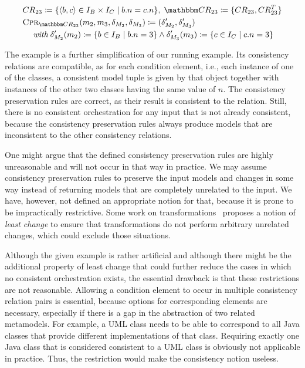 \begin{align*}
    &
    \consistencyrelation{CR}{23} \equalsperdefinition \setted{\tupled{b,c} \in \instances{\class{B}{}} \times \instances{\class{C}{}} \mid b.n = c.n}, \;
    \consistencyrelationset{CR}_{23} \equalsperdefinition \setted{\consistencyrelation{CR}{23}, \consistencyrelation{CR}{23}^T} \\
    &
    \consistencypreservationrule{\consistencyrelationset{CR}_{23}}(\model{m}{2}, \model{m}{3}, \change{\metamodel{M}{2}}, \change{\metamodel{M}{3}}) \equalsperdefinition (\change{\metamodel{M}{2}}', \change{\metamodel{M}{3}}') \\
    & \formulaskip
        \withmath \change{\metamodel{M}{2}}'(\model{m}{2}) \equalsperdefinition \setted{b \in \instances{\class{B}{}} \mid b.n = 3} \land \change{\metamodel{M}{3}}'(\model{m}{3}) \equalsperdefinition \setted{c \in \instances{\class{C}{}} \mid c.n = 3}
\end{align*}

The example is a further simplification of our running example.
Its consistency relations are compatible, as for each condition element, i.e., each instance of one of the classes, a consistent model tuple is given by that object together with instances of the other two classes having the same value of $n$.
The consistency preservation rules are correct, as their result is consistent to the relation.
Still, there is no consistent orchestration for any input that is not already consistent, because the consistency preservation rules always produce models that are inconsistent to the other consistency relations.

One might argue that the defined consistency preservation rules are highly unreasonable and will not occur in that way in practice.
We may assume consistency preservation rules to preserve the input models and changes in some way instead of returning models that are completely unrelated to the input.
We have, however, not defined an appropriate notion for that, because it is prone to be impractically restrictive.
Some work on transformations~\cite{cheney2017LeastChangeBx-JOT,macedo2016qvtAtlAlloy-SoSym} proposes a notion of \emph{least change} to ensure that transformations do not perform arbitrary unrelated changes, which could exclude those situations.

Although the given example is rather artificial and although there might be the additional property of least change that could further reduce the cases in which no consistent orchestration exists, the essential drawback is that these restrictions are not reasonable.
Allowing a condition element to occur in multiple consistency relation pairs is essential, because options for corresponding elements are necessary, especially if there is a gap in the abstraction of two related metamodels.
For example, a \gls{UML} class needs to be able to correspond to all Java classes that provide different implementations of that class.
Requiring exactly one Java class that is considered consistent to a \gls{UML} class is obviously not applicable in practice.
Thus, the restriction would make the consistency notion useless.

